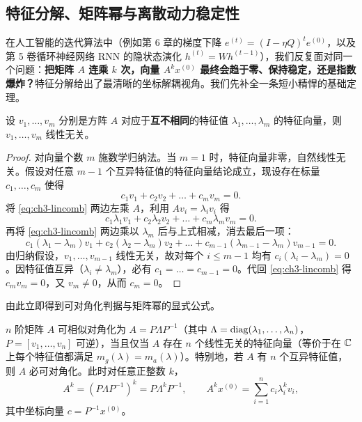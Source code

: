 \subsection{特征分解、矩阵幂与离散动力稳定性}

在人工智能的迭代算法中（例如第 6 章的梯度下降 $e^{(t)} = (I - \eta Q)^t e^{(0)}$，以及第 5 卷循环神经网络 RNN 的隐状态演化 $h^{(t)} = W h^{(t-1)}$），我们反复面对同一个问题：\textbf{把矩阵 $A$ 连乘 $k$ 次，向量 $A^k x^{(0)}$ 最终会趋于零、保持稳定，还是指数爆炸？}特征分解给出了最清晰的坐标解耦视角。我们先补全一条短小精悍的基础定理。

\begin{thmBox}
\begin{theorem}[互异特征值对应特征向量的线性无关性]
\label{thm:ch3-distinct-indep}
设 $v_1, \dots, v_m$ 分别是方阵 $A$ 对应于\textbf{互不相同}的特征值 $\lambda_1, \dots, \lambda_m$ 的特征向量，则 $v_1, \dots, v_m$ 线性无关。
\end{theorem}
\end{thmBox}

\begin{proof}
对向量个数 $m$ 施数学归纳法。当 $m=1$ 时，特征向量非零，自然线性无关。假设对任意 $m-1$ 个互异特征值的特征向量结论成立，现设存在标量 $c_1, \dots, c_m$ 使得
\begin{equation}
  c_1 v_1 + c_2 v_2 + \dots + c_m v_m = 0. \label{eq:ch3-lincomb}
\end{equation}
将 \eqref{eq:ch3-lincomb} 两边左乘 $A$，利用 $Av_i = \lambda_i v_i$ 得
\[
  c_1 \lambda_1 v_1 + c_2 \lambda_2 v_2 + \dots + c_m \lambda_m v_m = 0.
\]
再将 \eqref{eq:ch3-lincomb} 两边乘以 $\lambda_m$ 后与上式相减，消去最后一项：
\[
  c_1(\lambda_1 - \lambda_m) v_1 + c_2(\lambda_2 - \lambda_m) v_2 + \dots + c_{m-1}(\lambda_{m-1} - \lambda_m) v_{m-1} = 0.
\]
由归纳假设，$v_1, \dots, v_{m-1}$ 线性无关，故对每个 $i \le m-1$ 均有 $c_i(\lambda_i - \lambda_m) = 0$。因特征值互异（$\lambda_i \neq \lambda_m$），必有 $c_1 = \dots = c_{m-1} = 0$。代回 \eqref{eq:ch3-lincomb} 得 $c_m v_m = 0$，又 $v_m \neq 0$，从而 $c_m = 0$。
\end{proof}

由此立即得到可对角化判据与矩阵幂的显式公式。

\begin{proposition}[可对角化充要条件与解耦矩阵幂]
\label{prop:ch3-diag}
$n$ 阶矩阵 $A$ 可相似对角化为 $A = P \Lambda P^{-1}$（其中 $\Lambda = \operatorname{diag}(\lambda_1,\dots,\lambda_n)$，$P = [v_1,\dots,v_n]$ 可逆），当且仅当 $A$ 存在 $n$ 个线性无关的特征向量（等价于在 $\mathbb{C}$ 上每个特征值都满足 $m_g(\lambda) = m_a(\lambda)$）。特别地，若 $A$ 有 $n$ 个互异特征值，则 $A$ 必可对角化。此时对任意正整数 $k$，
\begin{equation}
  A^k = (P\Lambda P^{-1})^k = P \Lambda^k P^{-1}, \qquad A^k x^{(0)} = \sum_{i=1}^n c_i \lambda_i^k v_i, \label{eq:ch3-matpower}
\end{equation}
其中坐标向量 $c = P^{-1} x^{(0)}$。
\end{proposition}

